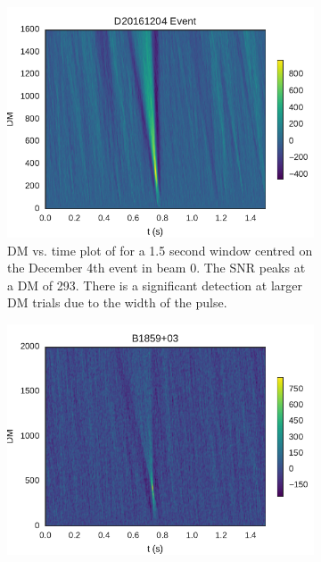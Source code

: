 \documentclass[a4paper,fleqn,usenatbib]{mnras}
\begin{document}
%
\begin{figure}
    \centering
    \begin{subfigure}[t]{0.5\textwidth}
        \centering\captionsetup{width=.95\linewidth}
        \includegraphics[width=1.0\textwidth]{figures/D20161204_dmtrials_buf23_Beam0.pdf}
        \caption{DM vs. time plot of for a 1.5 second window centred on the December
        4th event in beam 0. The SNR peaks at a DM of 293. There is a significant
        detection at larger DM trials due to the width of the pulse.
        }
        \label{fig:dm_time_event}
    \end{subfigure}
    \begin{subfigure}[t]{0.5\textwidth}
        \centering\captionsetup{width=.95\linewidth}
        \includegraphics[width=1.0\textwidth]{figures/B1859_dmtrials.pdf}

\end{subfigure}
\end{figure}
\end{document}
